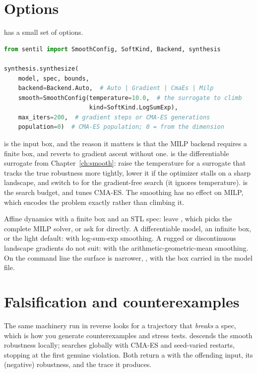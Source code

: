 \section{Options}

 has a small set of options.

\begin{lstlisting}[language=Python]
from sentil import SmoothConfig, SoftKind, Backend, synthesis

synthesis.synthesize(
    model, spec, bounds,
    backend=Backend.Auto,  # Auto | Gradient | CmaEs | Milp
    smooth=SmoothConfig(temperature=10.0,  # the surrogate to climb
                        kind=SoftKind.LogSumExp),
    max_iters=200,  # gradient steps or CMA-ES generations
    population=0)  # CMA-ES population; 0 = from the dimension
\end{lstlisting}

 is the input box, and the reason it matters is that the MILP backend requires a finite box, and  reverts to gradient ascent without one.  is the differentiable surrogate from Chapter~\ref{ch:smooth}: raise the temperature for a surrogate that tracks the true robustness more tightly, lower it if the optimizer stalls on a sharp landscape, and switch to  for the gradient-free search (it ignores temperature).  is the search budget, and  tunes CMA-ES. The smoothing has no effect on MILP, which encodes the problem exactly rather than climbing it.

Affine dynamics with a finite box and an STL spec: leave , which picks the complete MILP solver, or ask for  directly. A differentiable model, an infinite box, or the light default:  with log-sum-exp smoothing. A rugged or discontinuous landscape gradients do not suit:  with the arithmetic-geometric-mean smoothing. On the command line the surface is narrower, , with the box carried in the model file.

\section{Falsification and counterexamples}

The same machinery run in reverse looks for a trajectory that \emph{breaks} a spec, which is how you generate counterexamples and stress tests.  descends the smooth robustness locally;  searches globally with CMA-ES and seed-varied restarts, stopping at the first genuine violation. Both return a  with the offending input, its (negative) robustness, and the trace it produces.

